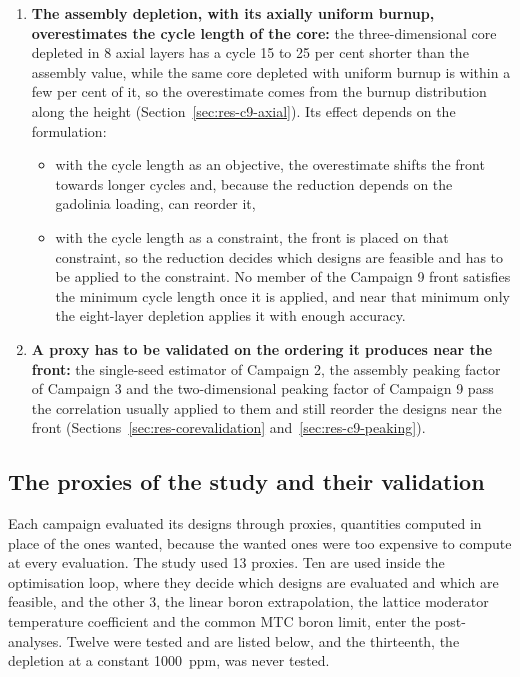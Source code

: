 \begin{enumerate}
        the gadolinia increases from 0.14 to \SI{4.42}{wt\%}, because a
        concentrated pin burns out slowly enough that no mid-cycle hump
        appears (Section~\ref{sec:res-c9-gd}).
    \item \textbf{The assembly depletion, with its axially uniform
        burnup, overestimates the cycle length of the core:} the
        three-dimensional core depleted in 8 axial layers has a cycle 15
        to 25 per cent shorter than the assembly value, while the same
        core depleted with uniform burnup is within a few per cent of
        it, so the overestimate comes from the burnup distribution along
        the height (Section~\ref{sec:res-c9-axial}). Its effect depends
        on the formulation:
        \begin{itemize}
          \item with the cycle length as an objective, the overestimate
                shifts the front towards longer cycles and, because the
                reduction depends on the gadolinia loading, can reorder
                it,
          \item with the cycle length as a constraint, the front is
                placed on that constraint, so the reduction decides which
                designs are feasible and has to be applied to the
                constraint. No member of the Campaign 9 front satisfies
                the minimum cycle length once it is applied, and near
                that minimum only the eight-layer depletion applies it
                with enough accuracy.
        \end{itemize}
  \item \textbf{A proxy has to be validated on the ordering it produces near the front:} the single-seed estimator of Campaign 2, the
        assembly peaking factor of Campaign 3 and the two-dimensional
        peaking factor of Campaign 9 pass the correlation usually
        applied to them and still reorder the designs near the front
        (Sections~\ref{sec:res-corevalidation}
        and~\ref{sec:res-c9-peaking}).
\end{enumerate}

\subsection{The proxies of the study and their validation}
\label{sec:concl-proxies}

Each campaign evaluated its designs through proxies, quantities computed in place of the ones wanted, because the wanted ones were too expensive to
compute at every evaluation. The study used 13 proxies. Ten
are used inside the optimisation loop, where they decide which designs
are evaluated and which are feasible, and the other 3, the linear boron
extrapolation, the lattice moderator temperature coefficient and the
common MTC boron limit, enter the post-analyses. Twelve were tested and
are listed below, and the thirteenth, the depletion at a constant
\SI{1000}{ppm}, was never tested.

